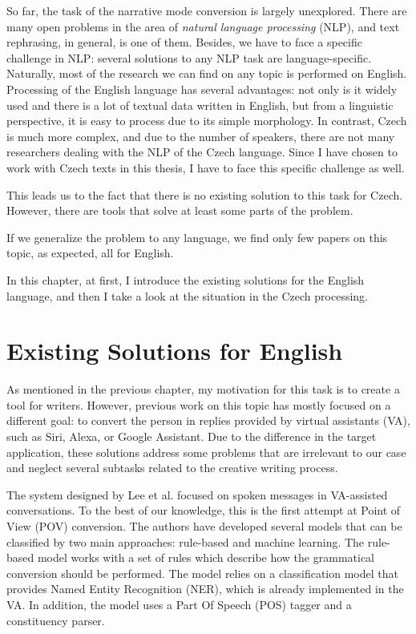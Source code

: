 So far, the task of the narrative mode conversion is largely unexplored. There are many open problems in the area of \emph{natural language processing} (NLP), and text rephrasing, in general, is one of them. Besides, we have to face a specific challenge in NLP: several solutions to any NLP task are language-specific. Naturally, most of the research we can find on any topic is performed on English. Processing of the English language has several advantages: not only is it widely used and there is a lot of textual data written in English, but from a linguistic perspective, it is easy to process due to its simple morphology. In contrast, Czech is much more complex, and due to the number of speakers, there are not many researchers dealing with the NLP  of the Czech language. Since I have chosen to work with Czech texts in this thesis, I have to face this specific challenge as well.

This leads us to the fact that there is no existing solution to this task for Czech. However, there are tools that solve at least some parts of the problem.

If we generalize the problem to any language, we find only few papers on this topic, as expected, all for English.

In this chapter, at first, I introduce the existing solutions for the English language, and then I take a look at the situation in the Czech processing.

\section{Existing Solutions for English}

As mentioned in the previous chapter, my motivation for this task is to create a tool for writers. However, previous work on this topic has mostly focused on a different goal: to convert the person in replies provided by virtual assistants (VA), such as Siri, Alexa, or Google Assistant. Due to the difference in the target application, these solutions address some problems that are irrelevant to our case and neglect several subtasks related to the creative writing process.

The system designed by Lee et al. \cite{lee2020converting} focused on spoken messages in VA-assisted conversations. To the best of our knowledge, this is the first attempt at Point of View (POV) conversion. The authors have developed several models that can be classified by two main approaches: rule-based and machine learning. The rule-based model works with a set of rules which describe how the grammatical conversion should be performed. The model relies on a classification model that provides Named Entity Recognition (NER), which is already implemented in the VA. In addition, the model uses a Part Of Speech (POS) tagger and a constituency parser.

